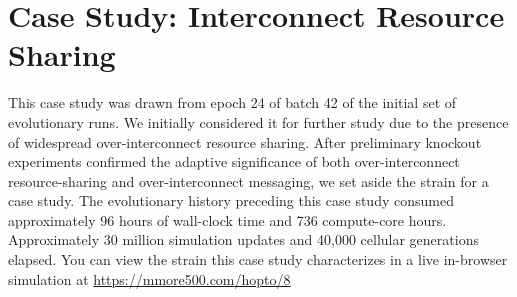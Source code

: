 \section{Case Study: Interconnect Resource Sharing} \label{sec:case_study_1042}



This case study was drawn from epoch 24 of batch 42 of the initial set of evolutionary runs.
We initially considered it for further study due to the presence of widespread over-interconnect resource sharing.
After preliminary knockout experiments confirmed the adaptive significance of both over-interconnect resource-sharing and over-interconnect messaging, we set aside the strain for a case study.
The evolutionary history preceding this case study consumed approximately 96 hours of wall-clock time and 736 compute-core hours.
Approximately 30 million simulation updates and 40,000 cellular generations elapsed.
You can view the strain this case study characterizes in a live in-browser simulation at \url{https://mmore500.com/hopto/8}


